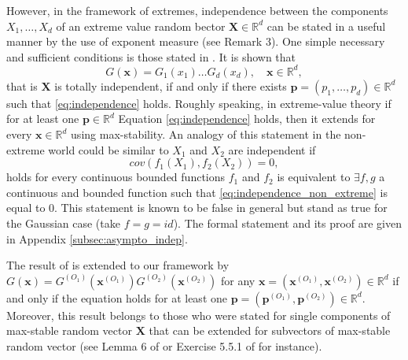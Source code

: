 \documentclass[11pt]{article}
\begin{document}
	However, in the framework of extremes, independence between the components $X_1, \dots, X_d$ of an extreme value random bector $\textbf{X} \in \mathbb{R}^d$ can be stated in a useful manner by the use of exponent measure (see Remark 3). One simple necessary and sufficient conditions is those stated in \cite{Takahashi1987SomePO, takahashi1994asymptotic}. It is shown that
	\begin{equation}
	\label{eq:independence}
		G(\textbf{x}) = G_1(x_1) \dots G_d(x_d), \quad \textbf{x} \in \mathbb{R}^d,
	\end{equation}
	 that is $\textbf{X}$ is totally independent, if and only if there exists $\textbf{p} = (p_1, \dots, p_d) \in \mathbb{R}^d$ such that \eqref{eq:independence} holds. Roughly speaking, in extreme-value theory if for at least one $\textbf{p} \in \mathbb{R}^d$ Equation \eqref{eq:independence} holds, then it extends for every $\textbf{x} \in \mathbb{R}^d$ using max-stability. An analogy of this statement in the non-extreme world could be similar to $X_1$ and $X_2$ are independent if
	 \begin{equation}
	 	\label{eq:independence_non_extreme}
	 	cov(f_1(X_1), f_2(X_2)) = 0,
	 \end{equation}
	 holds for every continuous bounded functions $f_1$ and $f_2$ is equivalent to $\exists f,g$ a continuous and bounded function such that \eqref{eq:independence_non_extreme} is equal to $0$. This statement is known to be false in general but stand as true for the Gaussian case (take $f = g = id$). The formal statement and its proof are given in Appendix \ref{subsec:asympto_indep}.
	 
	 The result of \cite{takahashi1994asymptotic} is extended to our framework by $G(\textbf{x}) = G^{(O_1)}(\textbf{x}^{(O_1)}) G^{(O_2)}(\textbf{x}^{(O_2)})$ for any $\textbf{x} = (\textbf{x}^{(O_1)}, \textbf{x}^{(O_2)}) \in \mathbb{R}^d$ if and only if the equation holds for at least one $\textbf{p} = (\textbf{p}^{(O_1)}, \textbf{p}^{(O_2)}) \in \mathbb{R}^d$. Moreover, this result belongs to those who were stated for single components of max-stable random vector $\textbf{X}$ that can be extended for subvectors of max-stable random vector (see Lemma 6 of \cite{papastathopoulos2016conditional} or Exercise 5.5.1 of \cite{resnick2008extreme} for instance).
	 
\end{document}
